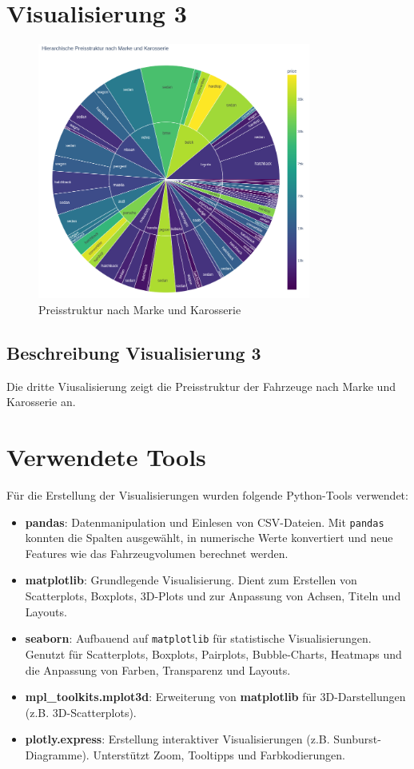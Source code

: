 \documentclass[a4paper,12pt]{article}
\begin{document}
\section{Visualisierung 3}
\begin{figure}[H]
    \centering
    \includegraphics[width=0.8\textwidth]{../images/preisstruktur_nach_marke_karosserie.png} %
    \caption{Preisstruktur nach Marke und Karosserie}
    \label{fig:vis3}
\end{figure}

\subsection*{Beschreibung Visualisierung 3}
Die dritte Viusalisierung zeigt die Preisstruktur der Fahrzeuge nach Marke und Karosserie an.


\section{Verwendete Tools}
Für die Erstellung der Visualisierungen wurden folgende Python-Tools verwendet:

\begin{itemize}
    \item \textbf{pandas}: Datenmanipulation und Einlesen von CSV-Dateien.
      Mit \texttt{pandas} konnten die Spalten ausgewählt, in numerische Werte konvertiert
      und neue Features wie das Fahrzeugvolumen berechnet werden.
    \item \textbf{matplotlib}: Grundlegende Visualisierung.
      Dient zum Erstellen von Scatterplots, Boxplots, 3D-Plots und zur Anpassung von Achsen, Titeln und Layouts.
    \item \textbf{seaborn}: Aufbauend auf \texttt{matplotlib} für statistische Visualisierungen.
      Genutzt für Scatterplots, Boxplots, Pairplots, Bubble-Charts, Heatmaps und die Anpassung von Farben, Transparenz und Layouts.
    \item \textbf{mpl\_toolkits.mplot3d}: Erweiterung von \textbf{matplotlib} für 3D-Darstellungen (z.B. 3D-Scatterplots).
    \item \textbf{plotly.express}: Erstellung interaktiver Visualisierungen (z.B. Sunburst-Diagramme).
      Unterstützt Zoom, Tooltipps und Farbkodierungen.
\end{itemize}
\end{document}
